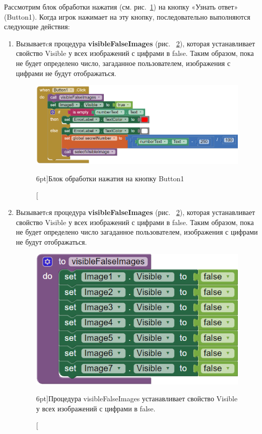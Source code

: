 Рассмотрим блок обработки нажатия (см. рис.~\ref{fig:block:button:click}) на кнопку «Узнать ответ» (Button1).
Когда игрок нажимает на эту кнопку, последовательно выполняются следующие действия:
\begin{enumerate}
  \item Вызываетcя процедура \textbf{visibleFalseImages} (рис. ~\ref{fig:block:visible:false:images}), которая устанавливает свойство Visible у всех изображений с цифрами в false. Таким образом, пока не будет определено число, загаданное пользователем, изображения с цифрами не будут отображаться.
  \begin{figure}
    \includegraphics{./graphics/programs/guess_numbers/block_Button1Click_AppInventor_2018.png}
      \caption[Блок обработки нажатия на кнопку Button1.][6pt]{Блок обработки нажатия на кнопку Button1}
    \label{fig:block:button:click}
  \end{figure}

  \item Вызываетcя процедура \textbf{visibleFalseImages} (рис. ~\ref{fig:block:visible:false:images}), которая устанавливает свойство Visible у всех изображений с цифрами в false. Таким образом, пока не будет определено число загаданное пользователем, изображения с цифрами не будут отображаться.
  \begin{figure}
    \includegraphics{./graphics/programs/guess_numbers/procedure_visibleFalseImages_AppInventor_2018.png}
      \caption[Процедура visibleFalseImages.][6pt]{Процедура visibleFalseImages устанавливает свойство Visible у всех изображений с цифрами в false.}
    \label{fig:block:visible:false:images}
  \end{figure}


\end{enumerate}
